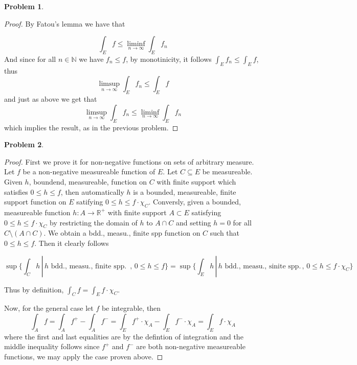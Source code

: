 \documentclass{article}
\newcommand{\R}{\mathbb{R}}
\newcommand{\N}{\mathbb{N}}
\newtheorem{prb}{Problem}
\begin{document}
	    \begin{prb}  \end{prb} 
	    \begin{proof} 
	  By Fatou's lemma we have that 
	  
	\[ \int_E f \leq \liminf_{n \to \infty} \int_E f_n \] 
	And since for all $n \in \N$ we have $f_n \leq f$, by monotinicity, it follows 
	$\int_E f_n \leq \int_E f$, thus 
	\[ \limsup_{n \to \infty} \int_E f_n \leq \int_E f \] 
	and just as above we get that  
	\[ \limsup_{n \to \infty} \int_E f_n \leq \liminf_{n \to \infty} \int_E f_n \] 
	which implies the result, as in the previous problem.  
\end{proof} 

\begin{prb}  \end{prb} 
\begin{proof} 
	First we prove it for non-negative functions on sets of arbitrary measure. Let $f$ be a non-negative measureable function of $E$. Let $C \subseteq E$ be measureable. 
	Given $h$, boundend, measureable, function on $C$ with finite support which satisfies $0 \leq h \leq f$, then 
	automatically $h$ is a bounded, measureable, finite support function on $E$ satifying $0 \leq h \leq f \cdot \chi_C$. 
	Conversly, given a bounded, measureable function $h:A \to \R^+$ with finite support $A \subset E$ satisfying $0 \leq h \leq f \cdot \chi_C$ by restricting the domain of $h$ to $A \cap C$ and setting $h = 0$ for all $C \setminus( A \cap C) $. We obtain a bdd., measu., finite spp function on $C$ such that $0 \leq h \leq f$.  Then it clearly follows 

	\[ \sup \{ \int_C h\, | \, h \text{ bdd., measu., finite spp. } \, , \, 0 \leq h \leq f \} 
	= \sup \{ \int_E h \, | \, h \text{ bdd., measu., sinite spp.} \, , \, 0 \leq h \leq f\cdot \chi_C \} \]

Thus by definition, $\int_C f = \int_E f \cdot \chi_C $. 

Now, for the general case let $f$ be integrable, then 
\begin{equation}
	\int_A f = \int_A f^+ - \int_A f^- = \int_E f^+ \cdot \chi_A - \int_E f^- \cdot \chi_A = \int_E f \cdot \chi_A 
\end{equation}
where the first and last equalities are by the defintion of integration and the middle inequality follows since $f^{+}$ and $f^{-}$ 
are both non-negative measureable functions, we may apply the case proven above. 
\end{proof} 
\end{document}
